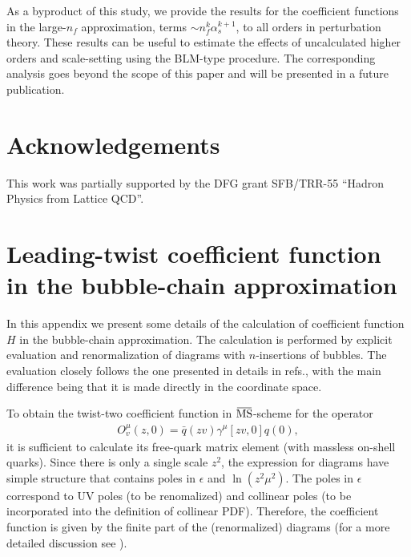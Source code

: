 \documentclass[aps,prd,twocolumn,a4paper,superscriptaddress,10pt,showpacs,notitlepage,floatfix]{revtex4-1}
\newcommand{\overbar}[1]{\mkern 1.5mu\overline{\mkern-1.5mu#1\mkern-1.5mu}\mkern 1.5mu}
\newcommand{\MSbar}{\overbar{\text{MS}}}
\begin{document}
As a byproduct of this study, we provide the results for the coefficient functions 
in the large-$n_f$ approximation, terms $\sim n_f^k\alpha_s^{k+1}$,  to all orders in perturbation theory.
These results can be useful to estimate the effects of uncalculated higher orders and scale-setting 
using the BLM-type procedure. The corresponding analysis goes beyond the scope of this paper and will be presented in a future publication.
 
\section*{Acknowledgements}

This  work  was  partially  supported  by  the  DFG grant SFB/TRR-55 ``Hadron Physics from Lattice QCD''.



\appendix 


%
\section{Leading-twist coefficient function in the bubble-chain approximation}
\label{App:H} 
%

In this appendix we present some details of the calculation of coefficient function $H$ in the bubble-chain approximation. The calculation is performed by explicit evaluation and renormalization of diagrams with $n$-insertions of bubbles. The evaluation closely follows the one presented in details in refs.\cite{Beneke:1995pq,Scimemi:2016ffw}, with the main difference being that it is made directly in the coordinate space.

To obtain the twist-two coefficient function in $\MSbar$-scheme for the operator
\begin{eqnarray}
O_v^\mu(z,0)=\bar q(z v)\gamma^\mu [zv,0]q(0),
\end{eqnarray}
it is sufficient to calculate its free-quark matrix element (with massless on-shell quarks). Since there is only a single scale $z^2$, the expression for diagrams have simple structure that contains poles in $\epsilon$ and $\ln(z^2\mu^2)$. The poles in $\epsilon$ correspond to UV poles (to be renomalized) and collinear poles (to be incorporated into the definition of collinear PDF). Therefore, the coefficient function is given by the finite part of the (renormalized) diagrams (for a more detailed discussion see \cite{Echevarria:2016scs,Scimemi:2016ffw}).
\end{document}
